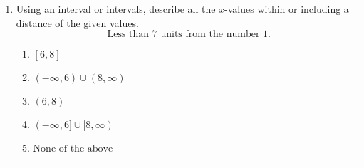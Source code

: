 \documentclass[14pt]{extbook}
\newcommand{\litem}[1]{\item#1\hspace*{-1cm}\rule{\textwidth}{0.4pt}}
\begin{document}
\begin{enumerate}
{\begin{enumerate}[label=\Alph*.]
\end{enumerate} }
\litem{
Using an interval or intervals, describe all the $x$-values within or including a distance of the given values.\[ \text{ Less than } 7 \text{ units from the number } 1. \]\begin{enumerate}[label=\Alph*.]
\item \( [6, 8] \)
\item \( (-\infty, 6) \cup (8, \infty) \)
\item \( (6, 8) \)
\item \( (-\infty, 6] \cup [8, \infty) \)
\item \( \text{None of the above} \)

\end{enumerate} }
\end{enumerate}
\end{document}
